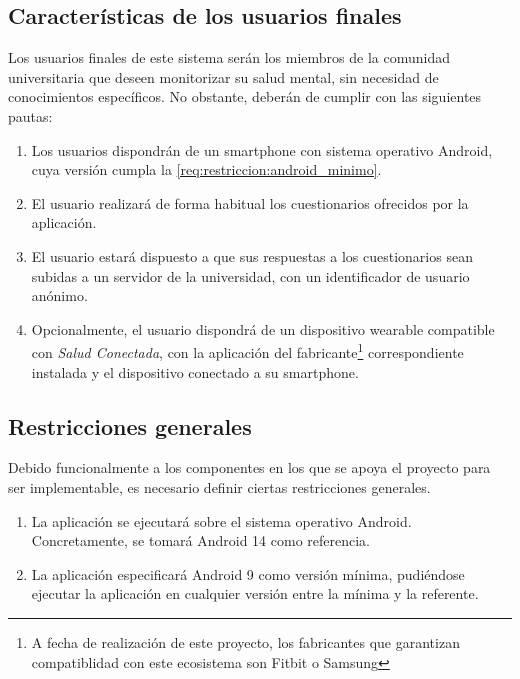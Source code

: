     \subsection{Características de los usuarios finales}
        \label{req:descripcion:usuarios}
        
        Los usuarios finales de este sistema serán los miembros de la comunidad universitaria que deseen monitorizar su salud mental, sin necesidad de conocimientos específicos. No obstante, deberán de cumplir con las siguientes pautas:
    
        \begin{enumerate}
            \item Los usuarios dispondrán de un \gls{smartphone} con sistema operativo Android, cuya versión cumpla la \ref{req:restriccion:android_minimo}.
            \item El usuario realizará de forma habitual los cuestionarios ofrecidos por la aplicación.
            \item El usuario estará dispuesto a que sus respuestas a los cuestionarios sean subidas a un servidor de la universidad, con un identificador de usuario anónimo.
            \item Opcionalmente, el usuario dispondrá de un dispositivo \gls{wearable} compatible con \textit{Salud Conectada}, con la aplicación del fabricante\footnote{A fecha de realización de este proyecto, los fabricantes que garantizan compatiblidad con este ecosistema son Fitbit o Samsung} correspondiente instalada y el dispositivo conectado a su \gls{smartphone}.
            
        \end{enumerate}
        
    \subsection{Restricciones generales}
        \label{req:descripcion:restricciones}
        Debido funcionalmente a los componentes en los que se apoya el proyecto para ser implementable, es necesario definir ciertas restricciones generales.
        \begin{enumerate}[label=\textbf{RG-\arabic*}]
            \item \label{req:restriccion:android_referencia} La aplicación se ejecutará sobre el sistema operativo Android. Concretamente, se tomará Android 14 como referencia.
            \item \label{req:restriccion:android_minimo} La aplicación especificará Android 9 como versión mínima, pudiéndose ejecutar la aplicación en cualquier versión entre la mínima y la referente.
        \end{enumerate}
    

